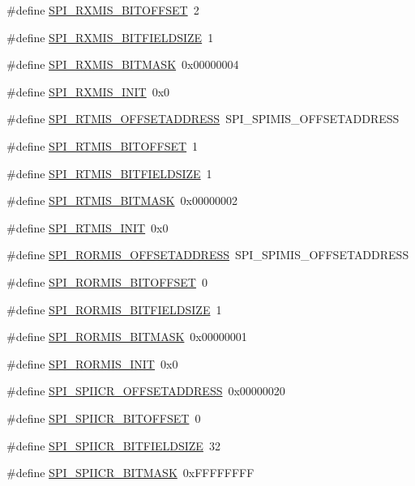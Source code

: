 \begin{DoxyCompactItemize}
\#define \hyperlink{a00573_ab2bf8ffb23b2c1e5c63dd61e90152a6e}{SPI\_\-RXMIS\_\-BITOFFSET}~2
\item 
\#define \hyperlink{a00573_ad2ba92c55a5196b711026de3cc6e255b}{SPI\_\-RXMIS\_\-BITFIELDSIZE}~1
\item 
\#define \hyperlink{a00573_a6703bc849f39949115183c767fd530d9}{SPI\_\-RXMIS\_\-BITMASK}~0x00000004
\item 
\#define \hyperlink{a00573_a0eb9ab11b19ad887df985c8b96cd2d4d}{SPI\_\-RXMIS\_\-INIT}~0x0
\item 
\#define \hyperlink{a00573_a15ef02cf82b573bd110bbbbf13039f53}{SPI\_\-RTMIS\_\-OFFSETADDRESS}~SPI\_\-SPIMIS\_\-OFFSETADDRESS
\item 
\#define \hyperlink{a00573_a405ac4f8c1a2839580c374beb3ee0a61}{SPI\_\-RTMIS\_\-BITOFFSET}~1
\item 
\#define \hyperlink{a00573_a5f955c5f3c09ec35af280ac192a5925a}{SPI\_\-RTMIS\_\-BITFIELDSIZE}~1
\item 
\#define \hyperlink{a00573_afdd65a70f35d843a6fbfa6bf8c1895f4}{SPI\_\-RTMIS\_\-BITMASK}~0x00000002
\item 
\#define \hyperlink{a00573_a476f42f80088901623eb6d094aa81ffd}{SPI\_\-RTMIS\_\-INIT}~0x0
\item 
\#define \hyperlink{a00573_adc9c3419ae723ecdf769ddd6d18cfb6c}{SPI\_\-RORMIS\_\-OFFSETADDRESS}~SPI\_\-SPIMIS\_\-OFFSETADDRESS
\item 
\#define \hyperlink{a00573_a391c430412c0b002a26b239a9f74bfa5}{SPI\_\-RORMIS\_\-BITOFFSET}~0
\item 
\#define \hyperlink{a00573_a32770f6db6a124288ea37856d841f1eb}{SPI\_\-RORMIS\_\-BITFIELDSIZE}~1
\item 
\#define \hyperlink{a00573_a66a4611e83d7a271912739d842e9491c}{SPI\_\-RORMIS\_\-BITMASK}~0x00000001
\item 
\#define \hyperlink{a00573_ad2ef79be1d9b4b9ea49852361084b6fd}{SPI\_\-RORMIS\_\-INIT}~0x0
\item 
\#define \hyperlink{a00573_a356267879c0295e9ef1f74dc838c8d32}{SPI\_\-SPIICR\_\-OFFSETADDRESS}~0x00000020
\item 
\#define \hyperlink{a00573_a38d9e4e3e205e09352e0222f2e3ddb6a}{SPI\_\-SPIICR\_\-BITOFFSET}~0
\item 
\#define \hyperlink{a00573_af27f74f7bbce2e5b786afce1d14669e0}{SPI\_\-SPIICR\_\-BITFIELDSIZE}~32
\item 
\#define \hyperlink{a00573_a7c2ace4513b174b3e4a15d14046ed8aa}{SPI\_\-SPIICR\_\-BITMASK}~0xFFFFFFFF
\item 

\end{DoxyCompactItemize}
